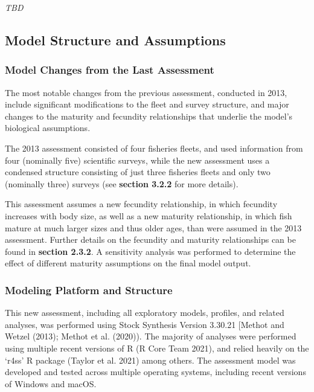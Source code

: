 \documentclass[11pt,
  english,
  letterpaper,
]{article}
\begin{document}
\emph{TBD}

\hypertarget{model-structure-and-assumptions}{%
\subsection{Model Structure and Assumptions}\label{model-structure-and-assumptions}}

\hypertarget{model-changes-from-the-last-assessment}{%
\subsubsection{Model Changes from the Last Assessment}\label{model-changes-from-the-last-assessment}}

The most notable changes from the previous assessment, conducted in 2013, include significant modifications to the fleet and survey structure, and major changes to the maturity and fecundity relationships that underlie the model's biological assumptions.

The 2013 assessment consisted of four fisheries fleets, and used information from four (nominally five) scientific surveys, while the new assessment uses a condensed structure consisting of just three fisheries fleets and only two (nominally three) surveys (see \textbf{section 3.2.2} for more details).

This assessment assumes a new fecundity relationship, in which fecundity increases with body size, as well as a new maturity relationship, in which fish mature at much larger sizes and thus older ages, than were assumed in the 2013 assessment. Further details on the fecundity and maturity relationships can be found in \textbf{section 2.3.2}. A sensitivity analysis was performed to determine the effect of different maturity assumptions on the final model output.

\hypertarget{modeling-platform-and-structure}{%
\subsubsection{Modeling Platform and Structure}\label{modeling-platform-and-structure}}

This new assessment, including all exploratory models, profiles, and related analyses, was performed using Stock Synthesis Version 3.30.21 {[}Methot and Wetzel (2013); Methot et al. (2020)). The majority of analyses were performed using multiple recent versions of R (R Core Team 2021), and relied heavily on the `r4ss' R package (Taylor et al. 2021) among others. The assessment model was developed and tested across multiple operating systems, including recent versions of Windows and macOS.
\end{document}
